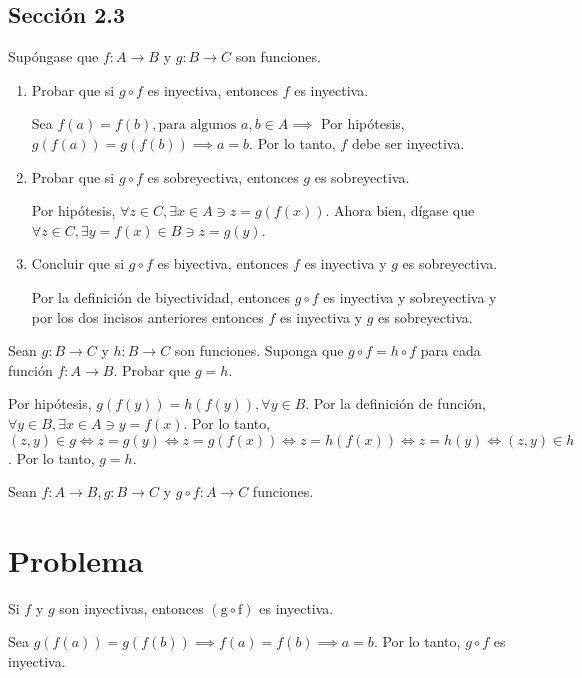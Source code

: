 \subsection{Sección 2.3}
\begin{problema}[Ejercicio 2]
	Supóngase que $f: A \rightarrow B$ y $g: B \rightarrow C$ son funciones. 
	\begin{enumerate}
		\item Probar que si $g \circ f$  es inyectiva, entonces $f$  es inyectiva. 
		\begin{dem}
			Sea $f(a)=f(b), \text{para algunos }  a,b\in A \implies $ Por hipótesis, $g(f(a))=g(f(b)) \implies a=b$. Por lo tanto, $f$ debe ser inyectiva. 
		\end{dem}
		\item Probar que si $g \circ f$  es sobreyectiva, entonces $g$  es sobreyectiva.
		\begin{dem}
			Por hipótesis, $\forall z \in C, \exists x \in A \ni z=g(f(x))$. Ahora bien, dígase que $\forall z \in C, \exists y=f(x) \in B\ni z=g(y)$.
		\end{dem}
		\item Concluir que si $g \circ f$ es biyectiva, entonces $f$  es inyectiva y $g$ es sobreyectiva.
		\begin{dem}
			Por la definición de biyectividad, entonces $g\circ f$ es inyectiva y sobreyectiva y por los dos incisos anteriores entonces $f$  es inyectiva y $g$ es sobreyectiva.
		\end{dem}
	\end{enumerate}
\end{problema}

\begin{problema}[Ejercicio 5]
	Sean $g: B \rightarrow C$ y $h: B \rightarrow C$ son funciones. Suponga que $g \circ f=h \circ f$ para cada función $f: A \rightarrow B$. Probar que $g=h$.
\end{problema}
\begin{dem}
	Por hipótesis, $g(f(y))=h(f(y)), \forall y \in B$. Por la definición de función, $\forall y \in B, \exists x\in A \ni y=f(x)$. Por lo tanto, $(z,y)\in g \iff z= g(y)\iff z= g(f(x))\iff z= h(f(x))\iff z= h(y)\iff (z,y)\in h$. Por lo tanto, $g=h$.  
\end{dem}
\newpage
	\begin{cajita}
		Sean $f: A\to B,g:B\to C$ y $g\circ f: A\to C$ funciones.
	\end{cajita}
\section{Problema}
\begin{problema}
	Si $f$ y $g$ son inyectivas, entonces $(\mathrm{g} \circ \mathrm{f})$ es inyectiva.
\end{problema}
\begin{dem}
	Sea $g(f(a))=g(f(b))\implies f(a)=f(b)\implies a=b$. Por lo tanto, $g\circ f$ es inyectiva. 
\end{dem}
